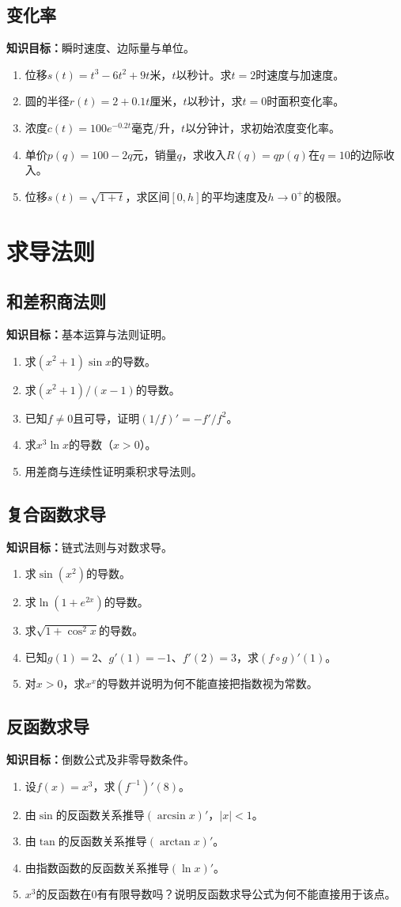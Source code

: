 \documentclass[11pt,a4paper,fontset=fandol]{ctexrep}
\newcommand{\goal}[1]{\textbf{知识目标：}#1\par}
\begin{document}
\subsection{变化率}
\goal{瞬时速度、边际量与单位。}
\begin{enumerate}
\item 位移$s(t)=t^3-6t^2+9t$米，$t$以秒计。求$t=2$时速度与加速度。
\item 圆的半径$r(t)=2+0.1t$厘米，$t$以秒计，求$t=0$时面积变化率。
\item 浓度$c(t)=100e^{-0.2t}$毫克/升，$t$以分钟计，求初始浓度变化率。
\item 单价$p(q)=100-2q$元，销量$q$，求收入$R(q)=qp(q)$在$q=10$的边际收入。
\item 位移$s(t)=\sqrt{1+t}$，求区间$[0,h]$的平均速度及$h\to0^+$的极限。
\end{enumerate}
\section{求导法则}
\subsection{和差积商法则}
\goal{基本运算与法则证明。}
\begin{enumerate}
\item 求$(x^2+1)\sin x$的导数。
\item 求$(x^2+1)/(x-1)$的导数。
\item 已知$f\ne0$且可导，证明$(1/f)'=-f'/f^2$。
\item 求$x^3\ln x$的导数（$x>0$）。
\item 用差商与连续性证明乘积求导法则。
\end{enumerate}
\subsection{复合函数求导}
\goal{链式法则与对数求导。}
\begin{enumerate}
\item 求$\sin(x^2)$的导数。
\item 求$\ln(1+e^{2x})$的导数。
\item 求$\sqrt{1+\cos^2x}$的导数。
\item 已知$g(1)=2$、$g'(1)=-1$、$f'(2)=3$，求$(f\circ g)'(1)$。
\item 对$x>0$，求$x^x$的导数并说明为何不能直接把指数视为常数。
\end{enumerate}
\subsection{反函数求导}
\goal{倒数公式及非零导数条件。}
\begin{enumerate}
\item 设$f(x)=x^3$，求$(f^{-1})'(8)$。
\item 由$\sin$的反函数关系推导$(\arcsin x)'$，$|x|<1$。
\item 由$\tan$的反函数关系推导$(\arctan x)'$。
\item 由指数函数的反函数关系推导$(\ln x)'$。
\item $x^3$的反函数在0有有限导数吗？说明反函数求导公式为何不能直接用于该点。
\end{enumerate}
\end{document}

